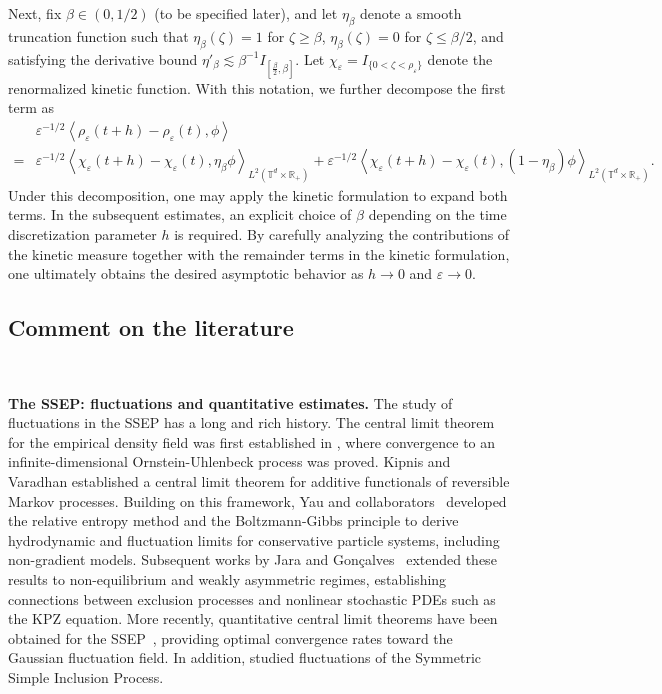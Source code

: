 \documentclass[UTF-8,reqno]{amsart}
\numberwithin{equation}{section}
\def\geq{\geqslant}
\def\leq{\leqslant}
\def\geq{\geqslant}
\def\leq{\leqslant}
\begin{document}
Next, fix $\beta \in (0, 1/2)$ (to be specified later), and let $\eta_{\beta}$ denote a smooth truncation function such that $\eta_{\beta}(\zeta) =1$ for $\zeta \geq \beta$, $\eta_{\beta}(\zeta) =0$ for $\zeta \leq \beta/2$, and satisfying the derivative bound $\eta'_{\beta} \lesssim \beta^{-1} I_{\left[\frac{\beta}{2}, \beta\right]}$. Let $\chi_{\varepsilon} = I_{\{0 < \zeta < \rho_{\varepsilon}\}}$ denote the renormalized kinetic function. With this notation, we further decompose the first term as 
\begin{align*}
&\varepsilon^{-1/2} \left\langle \rho_{\varepsilon}(t + h) - \rho_{\varepsilon}(t), \phi \right\rangle\\ 
=& \varepsilon^{-1/2} \left\langle \chi_{\varepsilon}(t + h) - \chi_{\varepsilon}(t), \eta_{\beta} \phi \right\rangle_{L^2(\mathbb{T}^d\times\mathbb{R}_+)}
+ \varepsilon^{-1/2} \left\langle \chi_{\varepsilon}(t + h) - \chi_{\varepsilon}(t), (1 - \eta_{\beta}) \phi \right\rangle_{L^2(\mathbb{T}^d\times\mathbb{R}_+)}.
\end{align*}
Under this decomposition, one may apply the kinetic formulation to expand both terms. In the subsequent estimates, an explicit choice of $\beta$ depending on the time discretization parameter $h$ is required. By carefully analyzing the contributions of the kinetic measure together with the remainder terms in the kinetic formulation, one ultimately obtains the desired asymptotic behavior as $h \to 0$ and $\varepsilon \to 0$.  
 




\subsection{Comment on the literature} \ 

{\bf The SSEP: fluctuations and quantitative estimates. }
The study of fluctuations in the SSEP has a long and rich history. The central limit theorem for the empirical density field was first established in \cite{R92}, where convergence to an infinite-dimensional Ornstein-Uhlenbeck process was proved. Kipnis and Varadhan \cite{KV86} established a central limit theorem for additive functionals of reversible Markov processes. Building on this framework, Yau and collaborators~\cite{Y91, CY92} developed the relative entropy method and the Boltzmann-Gibbs principle to derive hydrodynamic and fluctuation limits for conservative particle systems, including non-gradient models. Subsequent works by Jara and Gonçalves~\cite{J09, GJ14} extended these results to non-equilibrium and weakly asymmetric regimes, establishing connections between exclusion processes and nonlinear stochastic PDEs such as the KPZ equation. More recently, quantitative central limit theorems have been obtained for the SSEP~\cite{GK24}, providing optimal convergence rates toward the Gaussian fluctuation field. In addition, \cite{AZ24} studied fluctuations of the Symmetric Simple Inclusion Process.
\end{document}
